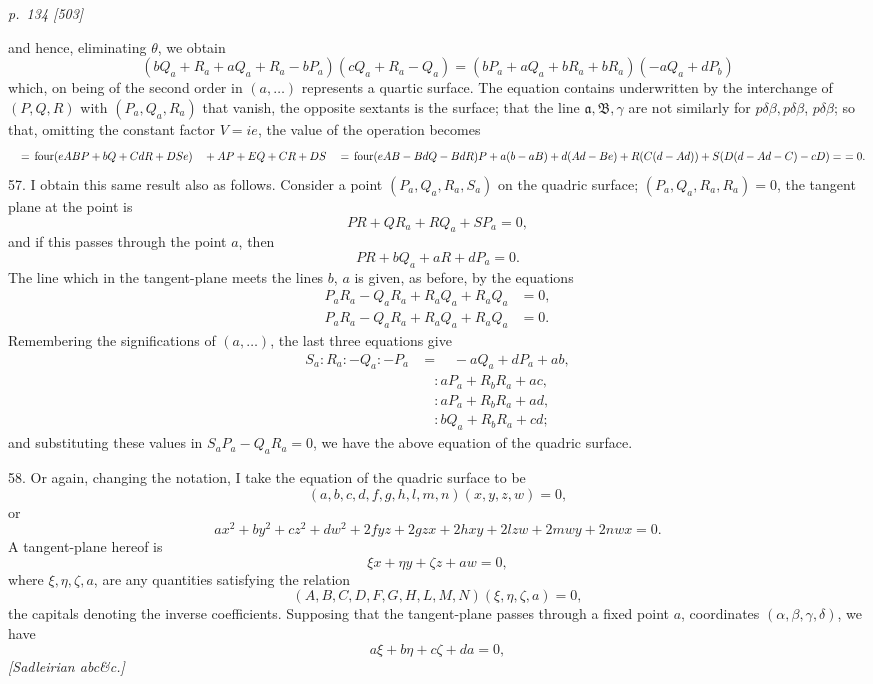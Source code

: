 \documentclass[11pt,a4paper]{book}
\begin{document}
\clearpage

\bigskip
\textit{p.~134 [503]}
\smallskip

\noindent
and hence, eliminating $\theta$, we obtain
\[
(bQ_a + R_a + aQ_a + R_a - bP_a)(cQ_a + R_a - Q_a) = (bP_a + aQ_a + bR_a + bR_a)(- aQ_a + dP_b)
\]
which, on being of the second order in $(a, \ldots)$ represents a quartic surface. The
equation contains underwritten by the interchange of $(P, Q, R)$ with $(P_a, Q_a, R_a)$ that vanish, the opposite
sextants is the surface; that the line $\mathfrak{a}, \mathfrak{B}, \gamma$ are not similarly for $p\delta\beta, p\delta\beta$,
$p\delta\beta$; so that, omitting the constant factor $V = ie$, the value of the
operation becomes
\[
\quad = \,\text{four}(eABP + b Q + CdR + DSe) \\
\quad + AP + EQ + CR + DS\\
\quad =\,\text{four}(eAB - BdQ - BdR)P + a(b - aB) + d(Ad - Be) + R(C(d - Ad)) + S(D(d - Ad - C) - cD) =\,\,= 0.
\]
57. I obtain this same result also as follows. Consider a point $(P_a, Q_a, R_a, S_a)$
on the quadric surface; $(P_a, Q_a, R_a, R_a) = 0$, the tangent plane at the point is
\[
P R + Q R_a + R Q_a + S P_a = 0,
\]
and if this passes through the point $a$, then
\[
P R + b Q_a + a R + d P_a = 0.
\]
The line which in the tangent-plane meets the lines $b$, $a$ is given, as before, by the
equations
\begin{align*}
P_a R_a - Q_a R_a + R_a Q_a + R_a Q_a & = 0,\\
P_a R_a - Q_a R_a + R_a Q_a + R_a Q_a & = 0.
\end{align*}
Remembering the significations of $(a, \ldots)$, the last three equations give
\begin{align*}
S_a : R_a : -Q_a : -P_a & = \quad - aQ_a + dP_a + ab,\\
& \quad : aP_a + R_b R_a + ac,\\
& \quad : aP_a + R_b R_a + ad,\\
& \quad : bQ_a + R_b R_a + cd;
\end{align*}
and substituting these values in $S_a P_a - Q_a R_a = 0$, we have the above equation of the
quadric surface.

58. Or again, changing the notation, I take the equation of the quadric surface
to be
\[
(a, b, c, d, f, g, h, l, m, n)(x, y, z, w) = 0,
\]
or
\[
ax^2 + by^2 + cz^2 + dw^2 + 2fyz + 2gzx + 2hxy + 2lzw + 2mwy + 2nwx = 0.
\]
A tangent-plane hereof is
\[
\xi x + \eta y + \zeta z + aw = 0,
\]
where $\xi, \eta, \zeta, a$, are any quantities satisfying the relation
\[
(A, B, C, D, F, G, H, L, M, N)(\xi, \eta, \zeta, a) = 0,
\]
the capitals denoting the inverse coefficients.
Supposing that the tangent-plane passes through a fixed point $a$, coordinates
$(\alpha, \beta, \gamma, \delta)$, we have
\[
a\xi + b\eta + c\zeta + d a = 0,
\]
\textit{[Sadleirian abc\&c.]}
\end{document}
